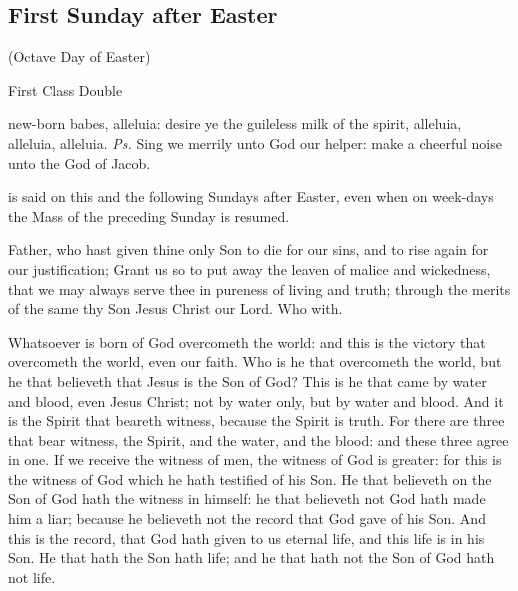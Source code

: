 \subsection{First Sunday after Easter}

\centerline{\small{(Octave Day of Easter)}}

\begin{inhead}
    {First Class Double}
\end{inhead}


\introit
{} new-born babes, alleluia: desire ye the guileless milk of the spirit, alleluia, alleluia, alleluia. \textit{Ps.} Sing we merrily unto God our helper: make a cheerful noise unto the God of Jacob.
\begin{rubric}
     is said on this and the following Sundays after Easter, even when on week-days the Mass of the preceding Sunday is resumed.
\end{rubric}
\collect
{} Father, who hast given thine only Son to die for our sins, and to rise again for our justification; Grant us so to put away the leaven of malice and wickedness, that we may always serve thee in pureness of living and truth; through the merits of the same thy Son Jesus Christ our Lord. Who with.

\clearpage
 Whatsoever is born of God overcometh the world: and this is the victory that overcometh the world, even our faith. Who is he that overcometh the world, but he that believeth that Jesus is the Son of God? This is he that came by water and blood, even Jesus Christ; not by water only, but by water and blood. And it is the Spirit that beareth witness, because the Spirit is truth. For there are three that bear witness, the Spirit, and the water, and the blood: and these three agree in one. If we receive the witness of men, the witness of God is greater: for this is the witness of God which he hath testified of his Son. He that believeth on the Son of God hath the witness in himself: he that believeth not God hath made him a liar; because he believeth not the record that God gave of his Son. And this is the record, that God hath given to us eternal life, and this life is in his Son. He that hath the Son hath life; and he that hath not the Son of God hath not life.


